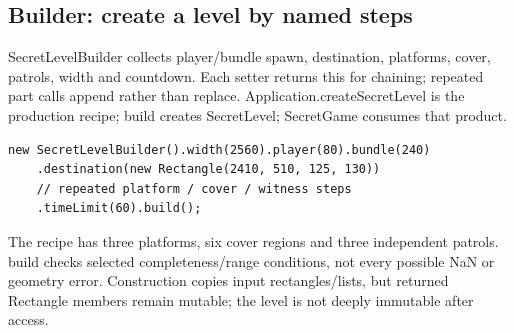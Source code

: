 \documentclass[11pt,a4paper]{article}
\begin{document}
\subsection*{Builder: create a level by named steps}
SecretLevelBuilder collects player/bundle spawn, destination, platforms, cover, patrols, width and countdown. Each setter returns this for chaining; repeated part calls append rather than replace. Application.createSecretLevel is the production recipe; build creates SecretLevel; SecretGame consumes that product.
\begin{lstlisting}
new SecretLevelBuilder().width(2560).player(80).bundle(240)
    .destination(new Rectangle(2410, 510, 125, 130))
    // repeated platform / cover / witness steps
    .timeLimit(60).build();
\end{lstlisting}
The recipe has three platforms, six cover regions and three independent patrols. build checks selected completeness/range conditions, not every possible NaN or geometry error. Construction copies input rectangles/lists, but returned Rectangle members remain mutable; the level is not deeply immutable after access.
\end{document}

